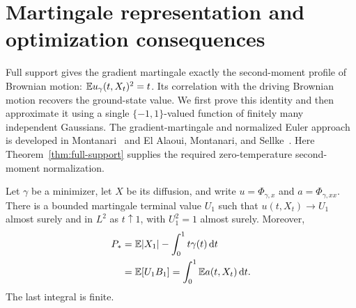 \section{Martingale representation and optimization consequences}
\label{sec:consequences}
Full support gives the gradient martingale exactly the second-moment
profile of Brownian motion: $\mathbb E u_\gamma(t,X_t)^2=t$. Its correlation with
the driving Brownian motion recovers the ground-state value. We first
prove this identity and then approximate it using a single
$\{-1,1\}$-valued function of finitely many independent Gaussians.
The gradient-martingale and normalized Euler approach is developed in
Montanari~\cite[Sections~2--3]{Montanari2019} and El Alaoui, Montanari,
and Sellke~\cite[Sections~5--6 of the cited preprint]{EAMS2021}.
Here Theorem~\ref{thm:full-support} supplies the required zero-temperature
second-moment normalization.

\begin{corollary}
\label{cor:value}
Let $\gamma$ be a minimizer, let $X$ be its diffusion, and write
$u=\Phi_{\gamma,x}$ and $a=\Phi_{\gamma,xx}$. There is a bounded
martingale terminal value $U_1$ such that $u(t,X_t)\to U_1$ almost surely
and in $L^2$ as $t\uparrow1$, with $U_1^2=1$ almost surely. Moreover,
\begin{equation}\label{eq:value-identities}
 \begin{aligned}
 P_*&=\mathbb E|X_1|-\int_0^1t\gamma(t)\,\mathrm d t\\
    &=\mathbb E[U_1 B_1]
     =\int_0^1\mathbb E a(t,X_t)\,\mathrm d t.
 \end{aligned}
\end{equation}
The last integral is finite.
\end{corollary}

